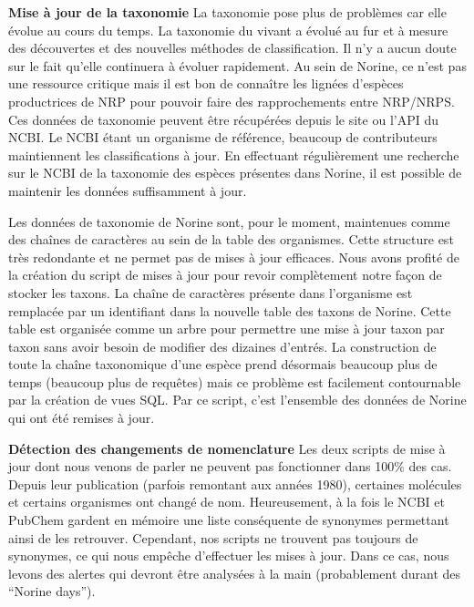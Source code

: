 \textbf{Mise à jour de la taxonomie} 
La taxonomie pose plus de problèmes car elle évolue au cours du temps.
La taxonomie du vivant a évolué au fur et à mesure des découvertes et des nouvelles méthodes de classification.
Il n'y a aucun doute sur le fait qu'elle continuera à évoluer rapidement.
Au sein de Norine, ce n'est pas une ressource critique mais il est bon de connaître les lignées d'espèces productrices de NRP pour pouvoir faire des rapprochements entre NRP/NRPS.
Ces données de taxonomie peuvent être récupérées depuis le site ou l'API du NCBI.
Le NCBI étant un organisme de référence, beaucoup de contributeurs maintiennent les classifications à jour.
En effectuant régulièrement une recherche sur le NCBI de la taxonomie des espèces présentes dans Norine, il est possible de maintenir les données suffisamment à jour.

Les données de taxonomie de Norine sont, pour le moment, maintenues comme des chaînes de caractères au sein de la table des organismes.
Cette structure est très redondante et ne permet pas de mises à jour efficaces.
Nous avons profité de la création du script de mises à jour pour revoir complètement notre façon de stocker les taxons.
La chaîne de caractères présente dans l'organisme est remplacée par un identifiant dans la nouvelle table des taxons de Norine.
Cette table est organisée comme un arbre pour permettre une mise à jour taxon par taxon sans avoir besoin de modifier des dizaines d'entrés.
La construction de toute la chaîne taxonomique d'une espèce prend désormais beaucoup plus de temps (beaucoup plus de requêtes) mais ce problème est facilement contournable par la création de vues SQL.
Par ce script, c'est l'ensemble des données de Norine qui ont été remises à jour.


\textbf{Détection des changements de nomenclature} 
Les deux scripts de mise à jour dont nous venons de parler ne peuvent pas fonctionner dans 100\% des cas.
Depuis leur publication (parfois remontant aux années 1980), certaines molécules et certains organismes ont changé de nom.
Heureusement, à la fois le NCBI et PubChem gardent en mémoire une liste conséquente de synonymes permettant ainsi de les retrouver.
Cependant, nos scripts ne trouvent pas toujours de synonymes, ce qui nous empêche d'effectuer les mises à jour.
Dans ce cas, nous levons des alertes qui devront être analysées à la main (probablement durant des ``Norine days'').


